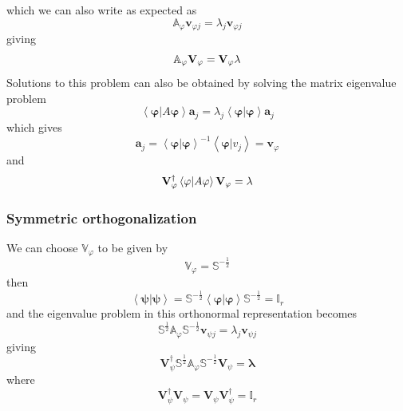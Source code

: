 \documentclass[aps,preprint]{revtex4}
\begin{document}
which we can also write as expected as 
\begin{equation}
\mathbb{A}_{\varphi }\mathbf{v}_{\varphi j}=\lambda _{j}\mathbf{v}_{\varphi
j}
\end{equation}%
giving 
\begin{equation}
\mathbb{A}_{\varphi }\mathbf{V}_{\varphi }=\mathbf{V}_{\varphi }\mathbf{%
\lambda }
\end{equation}%
Solutions to this problem can also be obtained by solving the matrix
eigenvalue problem 
\begin{equation}
\left\langle \mathbf{\varphi |}A\mathbf{\varphi }\right\rangle \mathbf{a}%
_{j}=\lambda _{j}\left\langle \mathbf{\varphi }|\mathbf{\varphi }%
\right\rangle \mathbf{a}_{j}
\end{equation}%
which gives 
\begin{equation}
\mathbf{a}_{j}=\left\langle \mathbf{\varphi }|\mathbf{\varphi }\right\rangle
^{-1}\left\langle \mathbf{\varphi }|v_{j}\right\rangle =\mathbf{v}_{\varphi }
\end{equation}%
and 
\begin{equation}
\mathbf{V}_{\varphi }^{\dagger }\left\langle \mathbf{\varphi |}A\mathbf{%
\varphi }\right\rangle \mathbf{V}_{\varphi }=\mathbf{\lambda }
\end{equation}

\subsubsection{Symmetric orthogonalization}

We can choose $\mathbb{V}_{\varphi }$ to be given by 
\begin{equation}
\mathbb{V}_{\varphi }=\mathbb{S}^{-\frac{1}{2}}
\end{equation}%
then 
\begin{equation}
\left\langle \mathbf{\psi }|\mathbf{\psi }\right\rangle =\mathbb{S}^{-\frac{1%
}{2}}\left\langle \mathbf{\varphi }|\mathbf{\varphi }\right\rangle \mathbb{S}%
^{-\frac{1}{2}}=\mathbb{I}_{r}
\end{equation}%
and the eigenvalue problem in this orthonormal representation becomes 
\begin{equation}
\mathbb{S}^{\frac{1}{2}}\mathbb{A}_{\varphi }\mathbb{S}^{-\frac{1}{2}}%
\mathbf{v}_{\psi j}=\lambda _{j}\mathbf{v}_{\psi j}
\end{equation}%
giving 
\begin{equation}
\mathbf{V}_{\psi }^{\dagger }\mathbb{S}^{\frac{1}{2}}\mathbb{A}_{\varphi }%
\mathbb{S}^{-\frac{1}{2}}\mathbf{V}_{\psi }=\mathbf{\lambda }
\end{equation}%
where 
\begin{equation}
\mathbf{V}_{\psi }^{\dagger }\mathbf{V}_{\psi }=\mathbf{V}_{\psi }\mathbf{V}%
_{\psi }^{\dagger }=\mathbb{I}_{r}
\end{equation}
\end{document}
